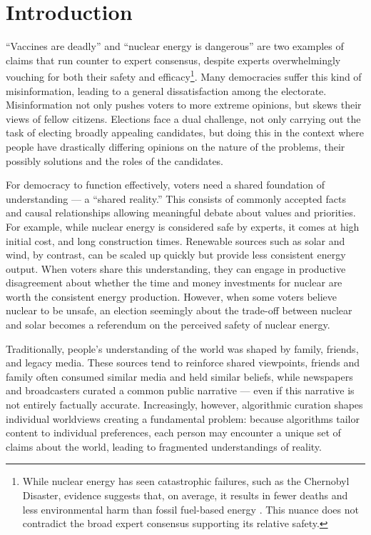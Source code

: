 \newpage
\chapter{Introduction}
\label{Introduction}

``Vaccines are deadly'' and ``nuclear energy is dangerous'' are two examples of
claims that run counter to expert consensus, despite experts overwhelmingly
vouching for both their safety and efficacy\footnote{While nuclear energy has
	seen catastrophic failures, such as the Chernobyl Disaster, evidence
	suggests that, on average, it results in fewer deaths and less environmental
	harm than fossil fuel-based energy \cite{ritchieWhatAreSafest2020}. This nuance does not contradict the broad
	expert consensus supporting its relative safety.}. Many democracies suffer this
kind of misinformation, leading to a general dissatisfaction among the
electorate. Misinformation not only pushes voters to more extreme opinions, but
skews their views of fellow citizens. Elections face a dual challenge, not only
carrying out the task of electing broadly appealing candidates, but doing this
in the context where people have drastically differing opinions on the nature
of the problems, their possibly solutions and the roles of the candidates.

For democracy to function effectively, voters need a shared foundation of
understanding --- a ``shared reality.'' This consists of commonly accepted
facts and causal relationships allowing meaningful debate about values and
priorities. For example, while nuclear energy is considered safe by experts, it
comes at high initial cost, and long construction times.
Renewable sources such as solar and wind, by contrast, can be scaled up quickly but provide less
consistent energy output. When voters share this understanding,
they can engage in productive disagreement about whether the time and money
investments for nuclear are worth the consistent energy production. However,
when some voters believe nuclear to be unsafe, an election seemingly about the
trade-off between nuclear and solar becomes a referendum on the perceived safety
of nuclear energy.

Traditionally, people's understanding of the world was shaped by family, friends,
and legacy media. These sources tend to reinforce shared viewpoints, friends
and family often consumed similar media and held similar beliefs, while
newspapers and broadcasters curated a common public narrative --- even if this narrative is not entirely factually accurate. Increasingly, however, algorithmic curation
shapes individual worldviews creating a fundamental problem: because algorithms
tailor content to individual preferences, each person may encounter a unique
set of claims about the world, leading to fragmented understandings of reality.

